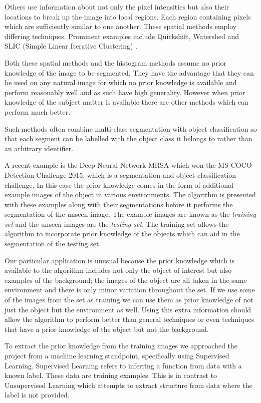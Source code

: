 \documentclass[12pt]{IIBproject}
\begin{document}
Others use information about not only the pixel intensities but also their locations to break up the image into local regions. Each region containing pixels which are sufficiently similar to one another. These spatial methods employ differing techniques.  Prominent examples include Quickshift\cite{vedaldi2008quick}, Watershed\cite{vincent1991watersheds} and SLIC (Simple Linear Iterative Clustering) \cite{achanta2012slic}.

 Both these spatial methods and the histogram methods assume no prior knowledge of the image to be segmented. They have the advantage that they can be used on any natural image for which no prior knowledge is available and perform reasonably well and as such have high generality. However when prior knowledge of the subject matter is available there are other methods which can perform much better. 
 
 Such methods often combine multi-class segmentation with object classification so that each segment can be labelled with the object class it belongs to rather than an arbitrary identifier. 
 
 A recent example is the Deep Neural Network MRSA\cite{he2015deep} which won the MS COCO Detection Challenge 2015\cite{mscoco}, which is a segmentation and object classification challenge. In this case the prior knowledge comes in the form of additional example images of the object in various environments. The algorithm is presented with these examples along with their segmentations before it performs the segmentation of the unseen image. The example images are known as the \emph{training set} and the unseen images are the \emph{testing set}. The training set allows the algorithm to incorporate prior knowledge of the objects which can aid in the segmentation of the testing set.

Our particular application is unusual because the prior knowledge which is available to the algorithm includes not only the object of interest but also examples of the background; the images of the object are all taken in the same environment and there is only minor variation throughout the set. If we use some of the images from the set as training we can use them as prior knowledge of not just the object but the environment as well. Using this extra information should allow the algorithm to perform better than general techniques or even techniques that have a prior knowledge of the object but not the background. 

To extract the prior knowledge from the training images we approached the project from a machine learning standpoint, specifically using Supervised Learning. Supervised Learning refers to inferring a function from data with a known label. These data are training examples. This is in contrast to Unsupervised Learning which attempts to extract structure from data where the label is not provided. 
\end{document}
